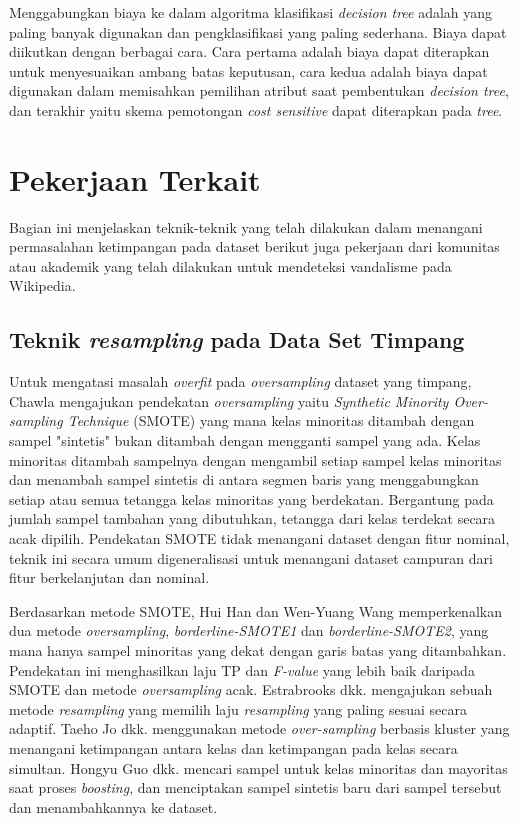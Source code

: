 Menggabungkan biaya ke dalam algoritma klasifikasi \textit{decision tree} adalah yang paling banyak digunakan dan pengklasifikasi yang paling sederhana.
Biaya dapat diikutkan dengan berbagai cara.
Cara pertama adalah biaya dapat diterapkan untuk menyesuaikan ambang batas keputusan, cara kedua adalah biaya dapat digunakan dalam memisahkan pemilihan atribut saat pembentukan \textit{decision tree}, dan terakhir yaitu skema pemotongan \textit{cost sensitive} dapat diterapkan pada \textit{tree}.

\label{sec:pekerjaan-terkait}
\section{Pekerjaan Terkait}

Bagian ini menjelaskan teknik-teknik yang telah dilakukan dalam menangani permasalahan ketimpangan pada dataset berikut juga pekerjaan dari komunitas atau akademik yang telah dilakukan untuk mendeteksi vandalisme pada Wikipedia.

\label{subsec:teknik-resampling-dataset-timpang}
\subsection{Teknik \textit{resampling} pada Data Set Timpang}

Untuk mengatasi masalah \textit{overfit} pada \textit{oversampling} dataset yang timpang, Chawla \cite{chawla2002smote} mengajukan pendekatan \textit{oversampling} yaitu \textit{Synthetic Minority Over-sampling Technique} (SMOTE) yang mana kelas minoritas ditambah dengan sampel "sintetis" bukan ditambah dengan mengganti sampel yang ada.
Kelas minoritas ditambah sampelnya dengan mengambil setiap sampel kelas minoritas dan menambah sampel sintetis di antara segmen baris yang menggabungkan setiap atau semua tetangga kelas minoritas yang berdekatan.
Bergantung pada jumlah sampel tambahan yang dibutuhkan, tetangga dari kelas terdekat secara acak dipilih.
Pendekatan SMOTE tidak menangani dataset dengan fitur nominal, teknik ini secara umum digeneralisasi untuk menangani dataset campuran dari fitur berkelanjutan dan nominal.

Berdasarkan metode SMOTE, Hui Han dan Wen-Yuang Wang \cite{han2005borderline} memperkenalkan dua metode \textit{oversampling}, \textit{borderline-SMOTE1} dan \textit{borderline-SMOTE2}, yang mana hanya sampel minoritas yang dekat dengan garis batas yang ditambahkan.
Pendekatan ini menghasilkan laju TP dan \textit{F-value} yang lebih baik daripada SMOTE dan metode \textit{oversampling} acak.
Estrabrooks dkk. \cite{estabrooks2004multiple} mengajukan sebuah metode \textit{resampling} yang memilih laju \textit{resampling} yang paling sesuai secara adaptif.
Taeho Jo dkk. \cite{jo2004class} menggunakan metode \textit{over-sampling} berbasis kluster yang menangani ketimpangan antara kelas dan ketimpangan pada kelas secara simultan.
Hongyu Guo dkk. \cite{guo2004learning} mencari sampel untuk kelas minoritas dan mayoritas saat proses \textit{boosting}, dan menciptakan sampel sintetis baru dari sampel tersebut dan menambahkannya ke dataset.

